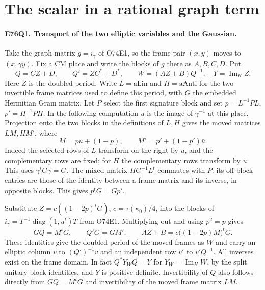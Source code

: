 \section{The scalar in a rational graph term}

\paragraph{E76Q1. Transport of the two elliptic variables and the Gaussian.}
Take the graph matrix $g=i_\gamma$ of O74E1, so the frame pair
$(x,y)$ moves to $(x,\gamma y)$. Fix a CM place and write the
blocks of $g$ there as $A,B,C,D$. Put
\[
 Q=CZ+D,\qquad Q'=ZC^*+D^*,\qquad
 W=(AZ+B)Q^{-1},\quad Y=\operatorname{Im}_H Z .
\]
Here $Z$ is the doubled period. Write $L=\mathrm{aLin}$ and
$H=\mathrm{aAnti}$ for the two invertible frame matrices used to
define this period, with $G$ the embedded Hermitian Gram matrix.
Let $P$ select the first signature block and set
$p=L^{-1}PL$, $p'=H^{-1}PH$. In the following computation $u$
is the image of $\gamma^{-1}$ at this place. Projection onto the
two blocks in the definitions of $L,H$ gives the moved matrices
$LM,HM'$, where
\[
 M=pu+(1-p),\qquad M'=p'+(1-p')\bar u.
\]
Indeed the selected rows of $L$ transform on the right by $u$,
and the complementary rows are fixed; for $H$ the complementary
rows transform by $\bar u$. This uses $\gamma^tG\bar\gamma=G$.
The mixed matrix $HG^{-1}L^t$ commutes with $P$: its off-block
entries are those of the identity between a frame matrix and its
inverse, in opposite blocks. This gives $p^tG=Gp'$.

Substitute $Z=c((1-2p)^tG)$, $c=\tau(\kappa_0)/4$, into the blocks
of $i_\gamma=T^{-1}\operatorname{diag}(1,u^t)T$ from O74E1.
Multiplying out and using $p^2=p$ gives
\[
 GQ=M^tG,\qquad Q'G=GM',\qquad
 AZ+B=c\big((1-2p)M\big)^tG.
\]
These identities give the doubled period of the moved frames as
$W$ and carry an elliptic column $v$ to $(Q')^{-1}v$ and an
independent row $v'$ to $v'Q^{-1}$. All inverses exist on the
frame domain. In fact $Q^*Y_W Q=Y$ for $Y_W=\operatorname{Im}_H W$,
by the split unitary block identities, and $Y$ is positive
definite. Invertibility of $Q$ also follows directly from
$GQ=M^tG$ and invertibility of the moved frame matrix $LM$.

